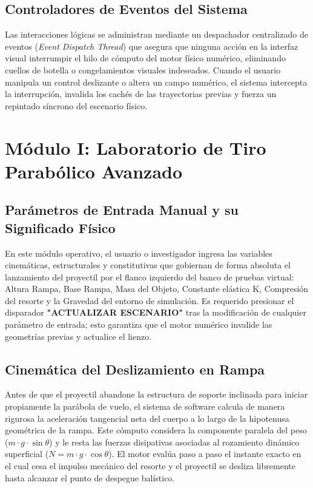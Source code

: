 \documentclass[11pt,a4paper]{article}
\begin{document}
	\subsection{Controladores de Eventos del Sistema}
	Las interacciones lógicas se administran mediante un despachador centralizado de eventos (\textit{Event Dispatch Thread}) que asegura que ninguna acción en la interfaz visual interrumpir el hilo de cómputo del motor físico numérico, eliminando cuellos de botella o congelamientos visuales indeseados. Cuando el usuario manipula un control deslizante o altera un campo numérico, el sistema intercepta la interrupción, invalida los cachés de las trayectorias previas y fuerza un repintado síncrono del escenario físico.
	
	\section{Módulo I: Laboratorio de Tiro Parabólico Avanzado}
	
	\subsection{Parámetros de Entrada Manual y su Significado Físico}
	En este módulo operativo, el usuario o investigador ingresa las variables cinemáticas, estructurales y constitutivas que gobiernan de forma absoluta el lanzamiento del proyectil por el flanco izquierdo del banco de pruebas virtual: Altura Rampa, Base Rampa, Masa del Objeto, Constante elástica K, Compresión del resorte y la Gravedad del entorno de simulación. Es requerido presionar el disparador \textbf{"ACTUALIZAR ESCENARIO"} tras la modificación de cualquier parámetro de entrada; esto garantiza que el motor numérico invalide las geometrías previas y actualice el lienzo.
	
	\subsection{Cinemática del Deslizamiento en Rampa}
	Antes de que el proyectil abandone la estructura de soporte inclinada para iniciar propiamente la parábola de vuelo, el sistema de software calcula de manera rigurosa la aceleración tangencial neta del cuerpo a lo largo de la hipotenusa geométrica de la rampa. Este cómputo considera la componente paralela del peso ($m \cdot g \cdot \sin\theta$) y le resta las fuerzas disipativas asociadas al rozamiento dinámico superficial ($N = m \cdot g \cdot \cos\theta$). El motor evalúa paso a paso el instante exacto en el cual cesa el impulso mecánico del resorte y el proyectil se desliza libremente hasta alcanzar el punto de despegue balístico.
	
\end{document}
